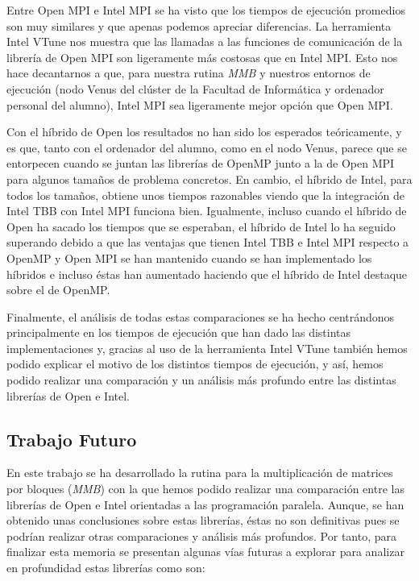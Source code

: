 \documentclass[a4paper,12pt]{article}
\begin{document}
Entre Open MPI e Intel MPI se ha visto que los tiempos de ejecución promedios son muy similares y que apenas podemos apreciar diferencias. La herramienta Intel VTune nos muestra que las llamadas a las funciones de comunicación de la librería de Open MPI son ligeramente más costosas que en Intel MPI. Esto nos hace decantarnos a que, para nuestra rutina {\it MMB} y nuestros entornos de ejecución (nodo Venus del clúster de la Facultad de Informática y ordenador personal del alumno), Intel MPI sea ligeramente mejor opción que Open MPI. 

Con el híbrido de Open los resultados no han sido los esperados teóricamente, y es que, tanto con el ordenador del alumno, como en el nodo Venus, parece que se entorpecen cuando se juntan las librerías de OpenMP junto a la de  Open MPI para algunos tamaños de problema concretos. En cambio, el híbrido de Intel, para todos los tamaños, obtiene unos tiempos razonables viendo que la integración de Intel TBB con Intel MPI funciona bien. Igualmente, incluso cuando el híbrido de Open ha sacado los tiempos que se esperaban, el híbrido de Intel lo ha seguido superando debido a que las ventajas que tienen Intel TBB e Intel MPI respecto a OpenMP y Open MPI se han mantenido cuando se han implementado los híbridos e incluso éstas han aumentado haciendo que el híbrido de Intel destaque sobre el de OpenMP.

Finalmente, el análisis de todas estas comparaciones se ha hecho centrándonos principalmente en los tiempos de ejecución que han dado las distintas implementaciones y, gracias al uso de la herramienta Intel VTune también hemos podido explicar el motivo de los distintos tiempos de ejecución, y así, hemos podido realizar una comparación y un análisis más profundo entre las distintas librerías de Open e Intel.



\subsection{Trabajo Futuro}
En este trabajo se ha desarrollado la rutina para la multiplicación de matrices por bloques ({\it MMB}) con la que hemos podido realizar una comparación entre las librerías de Open e Intel orientadas a las programación paralela. Aunque, se han obtenido unas conclusiones sobre estas librerías, éstas no son definitivas pues se podrían realizar otras comparaciones y análisis más profundos. Por tanto, para finalizar esta memoria se presentan algunas vías futuras a explorar para analizar en profundidad estas librerías como son:
\end{document}
